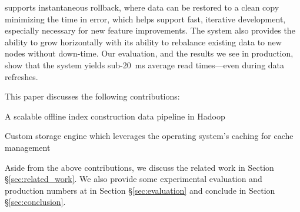 \projectname{} supports instantaneous rollback, where data can be
restored to a clean copy minimizing the time in error, which helps
support fast, iterative development, especially necessary for new
feature improvements. The system also provides the ability to grow
horizontally with its ability to rebalance existing data to new nodes
without down-time. Our evaluation, and the results we see in production, 
show that the system yields sub-20~ms average read times---even during data
refreshes. 

This paper discusses the following contributions:

\begin{compactitem}
	\item A scalable offline index construction data pipeline in Hadoop
        \item Custom storage engine which leverages the operating system's 
caching for cache management
\end{compactitem}

Aside from the above contributions, we discuss the related work in Section 
\S\ref{sec:related_work}. We also provide some experimental evaluation and
production numbers at \linkedin{} in Section \S\ref{sec:evaluation} and 
conclude in Section \S\ref{sec:conclusion}.


